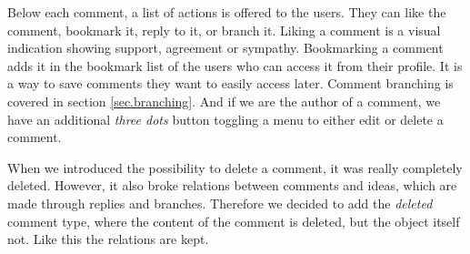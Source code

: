\documentclass[a4paper,12pt,twoside]{article}
\begin{document}
Below each comment, a list of actions is offered to the users.
They can like the comment, bookmark it, reply to it, or branch it.
Liking a comment is a visual indication showing support, agreement or sympathy.
Bookmarking a comment adds it in the bookmark list of the users who can access it from their profile.
It is a way to save comments they want to easily access later.
Comment branching is covered in section \ref{sec.branching}.
And if we are the author of a comment, we have an additional \emph{three dots} button toggling a menu to either edit or delete a comment.

When we introduced the possibility to delete a comment, it was really completely deleted.
However, it also broke relations between comments and ideas, which are made through replies and branches.
Therefore we decided to add the \emph{deleted} comment type, where the content of the comment is deleted, but the object itself not.
Like this the relations are kept.
\end{document}
